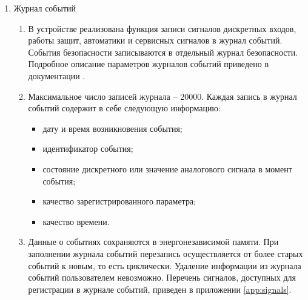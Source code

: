 \begin{enumerate}[label=\arabic{section}.\arabic{subsection}.\arabic*, labelsep=7pt, leftmargin=0pt, itemindent=60pt, align=left]
\begin{enumerate}
\item
Пуск осциллографа производится по факту изменения состояния дискретных сигналов, заданных в качестве критериев пуска.
В зависимости от длительности записи предаварийного и послеаварийного режима, в памяти может храниться разное количество осциллограмм.
Данные, собранные аварийным осциллографом, сохраняются в энергонезависимой памяти устройства и циклически перезаписываются.
Удаление записей аварийного осциллографа пользователем невозможно.

\item
Перечень сигналов, доступных для регистрации аварийным осциллографом, приведен в приложении \ref{app:signals}.

\end{enumerate}

\item Журнал событий
\begin{enumerate}

\item
В устройстве реализована функция записи сигналов дискретных входов, работы защит, автоматики и сервисных сигналов в журнал событий.
События безопасности записываются в отдельный журнал безопасности.
Подробное описание параметров журналов событий приведено в документации \ManualUnitGeneral.

\item
Максимальное число записей журнала -- 20000.
Каждая запись в журнал событий содержит в себе следующую информацию:
\begin{itemize}
\item дату и время возникновения события;
\item идентификатор события;
\item состояние дискретного или значение аналогового сигнала в момент события;
\item качество зарегистрированного параметра;
\item качество времени.
\end{itemize}

\item
Данные о событиях сохраняются в энергонезависимой памяти.
При заполнении журнала событий перезапись осуществляется от более старых событий к новым, то есть циклически.
Удаление информации из журнала событий пользователем невозможно.
Перечень сигналов, доступных для регистрации в журнале событий, приведен в приложении \ref{app:signals}.


\end{enumerate}
\end{enumerate}
